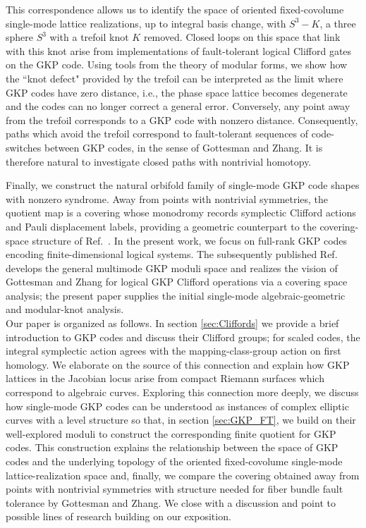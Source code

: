 \documentclass[a4paper, aps, pra, 11pt, onecolumn, tightenlines, superscriptaddress]{revtex4-2}
\begin{document}
This correspondence allows us to identify the space of oriented fixed-covolume single-mode lattice realizations, up to integral basis change, with $S^3-K$, a three sphere $S^3$ with a trefoil knot $K$ removed.
Closed loops on this space that link with this knot arise from implementations of fault-tolerant logical Clifford gates on the GKP code. 
Using tools from the theory of modular forms, we show how the ``knot defect" provided by the trefoil can be interpreted as the limit where GKP codes have zero distance, i.e., the phase space lattice becomes degenerate and the codes can no longer correct a general error. %
%
Conversely, any point away from the trefoil corresponds to a GKP code with nonzero distance. 
Consequently, paths which avoid the trefoil correspond to fault-tolerant sequences of code-switches between GKP codes, in the sense of Gottesman and Zhang. 
It is therefore natural to investigate closed paths with nontrivial homotopy. 

Finally, we construct the natural orbifold family of single-mode GKP code shapes with nonzero syndrome. Away from points with nontrivial symmetries, the quotient map is a covering whose monodromy records symplectic Clifford actions and Pauli displacement labels, providing a geometric counterpart to the covering-space structure of Ref.~\cite{gottesman2017fibre}.
%
In the present work, we focus on full-rank GKP codes encoding finite-dimensional logical systems.  The subsequently published Ref.~\cite{Burchards_GeometricGKP} develops the general multimode GKP moduli space and realizes the vision of Gottesman and Zhang for logical GKP Clifford operations via a covering space analysis; the present paper supplies the initial single-mode algebraic-geometric and modular-knot analysis.
\medskip
\\
Our paper is organized as follows. 
In section \ref{sec:Cliffords} we provide a brief introduction to GKP codes and discuss their Clifford groups; for scaled codes, the integral symplectic action agrees with the mapping-class-group action on first homology. 
We elaborate on the source of this connection and explain how GKP lattices in the Jacobian locus arise from compact Riemann surfaces which correspond to algebraic curves.
Exploring this connection more deeply, we discuss how single-mode GKP codes can be understood as instances of complex elliptic curves with a level structure so that, in section \ref{sec:GKP_FT}, we build on their well-explored moduli to construct the corresponding finite quotient for GKP codes. 
This construction explains the relationship between the space of GKP codes and the underlying topology of the oriented fixed-covolume single-mode lattice-realization space and, finally, we compare the covering obtained away from points with nontrivial symmetries with structure needed for fiber bundle fault tolerance by Gottesman and Zhang. 
We close with a discussion and point to possible lines of research building on our exposition.
\end{document}
